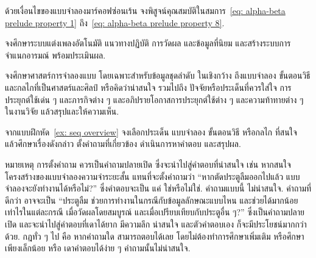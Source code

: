 \begin{Exercise}
	\label{ex: seq HMM conditional independence properties}
	
	ด้วยเงื่อนไขของแบบจำลองมาร์คอฟซ่อนเร้น
	จงพิสูจน์คุณสมบัติในสมการ~\ref{eq: alpha-beta prelude property 1} ถึง~\ref{eq: alpha-beta prelude property 8}.

\end{Exercise}

\begin{Exercise}
	\label{ex: seq music generation}
	
	จงศึกษาระบบแต่งเพลงอัตโนมัติ แนวทางปฏิบัติ การวัดผล และข้อมูลที่นิยม
	และสร้างระบบการจำแนกอารมณ์ พร้อมประเมินผล.
	
	
\end{Exercise}


\begin{Exercise}
	\label{ex: seq overview}
	
	จงศึกษาศาสตร์การจำลองแบบ โดยเฉพาะสำหรับข้อมูลชุดลำดับ ในเชิงกว้าง
	ถึงแบบจำลอง ขั้นตอนวิธี และกลไกที่เป็นศาสตร์และศิลป์ 
	หรือคิดว่าน่าสนใจ
	รวมไปถึง ปัจจัยหรือประเด็นที่ควรใส่ใจ การประยุกต์ใช้เด่น ๆ และภารกิจต่าง ๆ
	และอภิปรายโอกาสการประยุกต์ใช้ต่าง ๆ 
	และความท้าทายต่าง ๆ ในงานวิจัย 
	แล้วสรุปและให้ความเห็น.
	
\end{Exercise}

\begin{Exercise}
	\label{ex: seq dig}
	
	จากแบบฝึกหัด~\ref{ex: seq overview}
	จงเลือกประเด็น แบบจำลอง ขั้นตอนวิธี หรือกลไก
	ที่สนใจ
	แล้วศึกษาเรื่องดังกล่าว ตั้งคำถามที่เกี่ยวข้อง ดำเนินการหาคำตอบ และสรุปผล.
	
หมายเหตุ การตั้งคำถาม ควรเป็นคำถามปลายเปิด ซึ่งจะนำไปสู่คำตอบที่น่าสนใจ
เช่น หากสนใจโครงสร้างของแบบจำลองความจำระยะสั้น
แทนที่จะตั้งคำถามว่า 
``หากตัดประตูลืมออกไปแล้ว แบบจำลองจะยังทำงานได้หรือไม่?''
ซึ่งคำตอบจะเป็น แค่ ใช่หรือไม่ใช่.
คำถามแบบนี้ ไม่น่าสนใจ.
คำถามที่ดีกว่า 
อาจจะเป็น
``ประตูลืม ช่วยการทำงานในกรณีกับข้อมูลลักษณะแบบไหน และช่วยได้มากน้อยเท่าไรในแต่ละกรณี
เมื่อวัดผลโดยสมบูรณ์ และเมื่อเปรียบเทียบกับประตูอื่น ๆ?''
ซึ่งเป็นคำถามปลายเปิด 
และจะนำไปสู่คำตอบที่เดาได้ยาก มีความลึก น่าสนใจ และตัวคำตอบเอง
ก็จะมีประโยชน์มากกว่าด้วย.
กฎทั่ว ๆ ไป คือ
หากคำถามใด สามารถตอบได้เลย โดยไม่ต้องทำการศึกษาเพิ่มเติม หรือศึกษาเพียงเล็กน้อย
หรือ เดาคำตอบได้ง่าย ๆ
คำถามนั้นไม่น่าสนใจ.

\end{Exercise}
